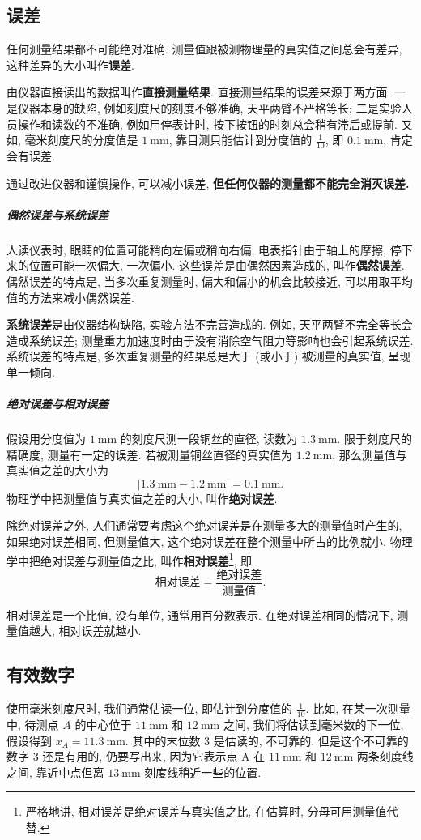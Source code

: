 \documentclass[UTF8,openany,fontset=fandol]{ctexbook}
\theoremstyle{chinesetextbook}
\newcommand{\unit}[1]{\ \mathrm{#1}}
\begin{document}
\subsection{误差}
任何测量结果都不可能绝对准确. 测量值跟被测物理量的真实值之间总会有差异, 这种差异的大小叫作\textbf{误差}.

由仪器直接读出的数据叫作\textbf{直接测量结果}. 直接测量结果的误差来源于两方面. 一是仪器本身的缺陷, 例如刻度尺的刻度不够准确, 天平两臂不严格等长; 二是实验人员操作和读数的不准确, 例如用停表计时, 按下按钮的时刻总会稍有滞后或提前. 又如, 毫米刻度尺的分度值是 $1\unit{mm}$, 靠目测只能估计到分度值的 $\displaystyle\frac{1}{10}$, 即 $0.1\unit{mm}$, 肯定会有误差.

通过改进仪器和谨慎操作, 可以减小误差, \textbf{但任何仪器的测量都不能完全消灭误差.}

\subparagraph{偶然误差与系统误差} 人读仪表时, 眼睛的位置可能稍向左偏或稍向右偏, 电表指针由于轴上的摩擦, 停下来的位置可能一次偏大, 一次偏小. 这些误差是由偶然因素造成的, 叫作\textbf{偶然误差}. 偶然误差的特点是, 当多次重复测量时, 偏大和偏小的机会比较接近, 可以用取平均值的方法来减小偶然误差.

\textbf{系统误差}是由仪器结构缺陷, 实验方法不完善造成的. 例如, 天平两臂不完全等长会造成系统误差; 测量重力加速度时由于没有消除空气阻力等影响也会引起系统误差. 系统误差的特点是, 多次重复测量的结果总是大于 (或小于) 被测量的真实值, 呈现单一倾向.

\subparagraph{绝对误差与相对误差} 假设用分度值为 $1\unit{mm}$ 的刻度尺测一段铜丝的直径, 读数为 $1.3\unit{mm}$. 限于刻度尺的精确度, 测量有一定的误差. 若被测量铜丝直径的真实值为 $1.2\unit{mm}$, 那么测量值与真实值之差的大小为
\[
|1.3\unit{mm}-1.2\unit{mm}|=0.1\unit{mm}.
\]
物理学中把测量值与真实值之差的大小, 叫作\textbf{绝对误差}.

除绝对误差之外, 人们通常要考虑这个绝对误差是在测量多大的测量值时产生的, 如果绝对误差相同, 但测量值大, 这个绝对误差在整个测量中所占的比例就小. 物理学中把绝对误差与测量值之比, 叫作\textbf{相对误差}\footnote{严格地讲, 相对误差是绝对误差与真实值之比, 在估算时, 分母可用测量值代替.}, 即
\[
\text{相对误差}=\frac{\text{绝对误差}}{\text{测量值}}.
\]

相对误差是一个比值, 没有单位, 通常用百分数表示. 在绝对误差相同的情况下, 测量值越大, 相对误差就越小.
\subsection{有效数字}
使用毫米刻度尺时, 我们通常估读一位, 即估计到分度值的 $\displaystyle\frac{1}{10}$. 比如, 在某一次测量中, 待测点 $A$ 的中心位于 $11\unit{mm}$ 和 $12\unit{mm}$ 之间, 我们将估读到毫米数的下一位, 假设得到 $x_A=11.3\unit{mm}$. 其中的末位数 3 是估读的, 不可靠的. 但是这个不可靠的数字 3 还是有用的, 仍要写出来, 因为它表示点 A 在 $11\unit{mm}$ 和 $12\unit{mm}$ 两条刻度线之间, 靠近中点但离 $13\unit{mm}$ 刻度线稍近一些的位置.
\end{document}
